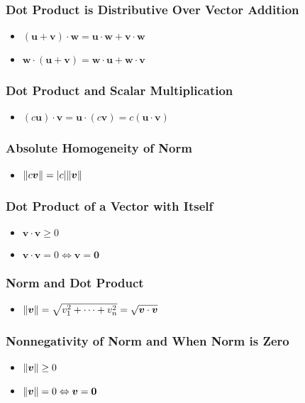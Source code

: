 \documentclass[../ma2001_notes.tex]{subfiles}
\begin{document}
\subsubsection{Dot Product is Distributive Over Vector Addition}
\begin{itemize}
	\item\((\bm{u}+\bm{v})\cdot\bm{w}=\bm{u}\cdot\bm{w}+\bm{v}\cdot\bm{w}\)
	\item\(\bm{w}\cdot(\bm{u}+\bm{v})=\bm{w}\cdot\bm{u}+\bm{w}\cdot\bm{v}\)
\end{itemize}

\subsubsection{Dot Product and Scalar Multiplication}
\begin{itemize}
	\item\((c\bm{u})\cdot\bm{v}=\bm{u}\cdot(c\bm{v})=c(\bm{u}\cdot\bm{v})\)
\end{itemize}

\subsubsection{Absolute Homogeneity of Norm}
\begin{itemize}
	\item\(\lVert c\bm{v}\rVert=\lvert c\rvert\lVert\bm{v}\rVert\)
\end{itemize}

\subsubsection{Dot Product of a Vector with Itself}
\begin{itemize}
	\item\(\bm{v}\cdot\bm{v}\geq0\)
	\item\(\bm{v}\cdot\bm{v}=0\Leftrightarrow\bm{v}=\bm{0}\)
\end{itemize}

\subsubsection{Norm and Dot Product}
\begin{itemize}
	\item\(\lVert\bm{v}\rVert=\sqrt{v_1^2+\cdots+v_n^2}=\sqrt{\bm{v}\cdot\bm{v}}\)
\end{itemize}

\subsubsection{Nonnegativity of Norm and When Norm is Zero}
\begin{itemize}
	\item\(\lVert\bm{v}\rVert\geq0\)
	\item\(\lVert\bm{v}\rVert=0\Leftrightarrow\bm{v}=\bm{0}\)
\end{itemize}
\end{document}
